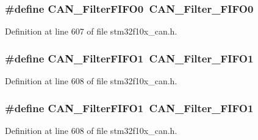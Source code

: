 \subsubsection[{\texorpdfstring{C\+A\+N\+\_\+\+Filter\+F\+I\+F\+O0}{CAN_FilterFIFO0}}]{\setlength{\rightskip}{0pt plus 5cm}\#define C\+A\+N\+\_\+\+Filter\+F\+I\+F\+O0~{\bf C\+A\+N\+\_\+\+Filter\+\_\+\+F\+I\+F\+O0}}\hypertarget{group___c_a_n___legacy_ga1b3d041dff9fed4dad75ed2a4a0e27e0}{}\label{group___c_a_n___legacy_ga1b3d041dff9fed4dad75ed2a4a0e27e0}


Definition at line 607 of file stm32f10x\+\_\+can.\+h.

\subsubsection[{\texorpdfstring{C\+A\+N\+\_\+\+Filter\+F\+I\+F\+O1}{CAN_FilterFIFO1}}]{\setlength{\rightskip}{0pt plus 5cm}\#define C\+A\+N\+\_\+\+Filter\+F\+I\+F\+O1~{\bf C\+A\+N\+\_\+\+Filter\+\_\+\+F\+I\+F\+O1}}\hypertarget{group___c_a_n___legacy_gada8f9b3a9c88f36539aaeb457039e666}{}\label{group___c_a_n___legacy_gada8f9b3a9c88f36539aaeb457039e666}


Definition at line 608 of file stm32f10x\+\_\+can.\+h.

\subsubsection[{\texorpdfstring{C\+A\+N\+\_\+\+Filter\+F\+I\+F\+O1}{CAN_FilterFIFO1}}]{\setlength{\rightskip}{0pt plus 5cm}\#define C\+A\+N\+\_\+\+Filter\+F\+I\+F\+O1~{\bf C\+A\+N\+\_\+\+Filter\+\_\+\+F\+I\+F\+O1}}\hypertarget{group___c_a_n___legacy_gada8f9b3a9c88f36539aaeb457039e666}{}\label{group___c_a_n___legacy_gada8f9b3a9c88f36539aaeb457039e666}


Definition at line 608 of file stm32f10x\+\_\+can.\+h.

